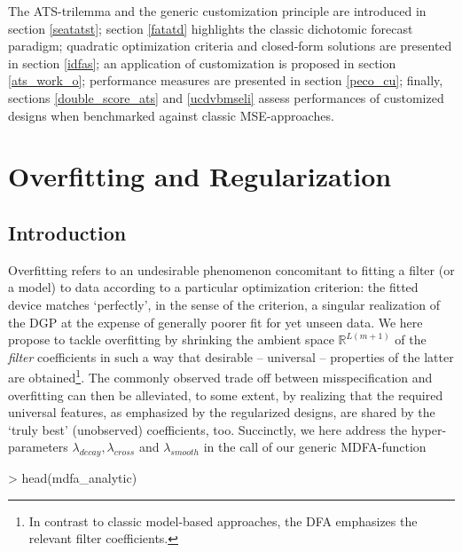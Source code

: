 \documentclass[a4paper]{book}
\begin{document}
The ATS-trilemma and the generic customization principle are introduced
 in section \ref{seatatst}; section \ref{fatatd} highlights the classic
 dichotomic forecast paradigm; quadratic optimization criteria and 
closed-form solutions are presented in section \ref{idfas}; an application
 of customization is proposed in section \ref{ats_work_o}; performance
 measures are presented in section \ref{peco_cu}; finally,
 sections \ref{double_score_ats} and \ref{ucdvbmseli} assess 
performances of customized designs when benchmarked against classic
 MSE-approaches. 










\chapter{Overfitting and Regularization}\label{reg_sec}

\section{Introduction}


Overfitting refers to an undesirable phenomenon concomitant to fitting a filter (or a model) to data according to a particular optimization criterion: the fitted device matches `perfectly', in the sense of the criterion, a singular realization of the DGP at the expense of generally poorer fit for yet unseen data. We here propose to tackle overfitting by shrinking the ambient space $\mathbb{R}^{L(m+1)}$ of the \emph{filter} coefficients in such a way that desirable -- universal -- properties of the latter are obtained\footnote{In contrast to classic model-based approaches, the DFA  emphasizes the relevant filter coefficients.}. The commonly observed trade off between misspecification and overfitting can then be alleviated,  to some extent, by realizing that the required universal features, as emphasized by the regularized designs, are shared by the `truly best' (unobserved) coefficients, too. Succinctly,  we here address the hyper-parameters $\lambda_{decay},\lambda_{cross}$ and $\lambda_{smooth}$ in the call of our generic MDFA-function
\begin{Schunk}
\begin{Sinput}
> head(mdfa_analytic)
\end{Sinput}
\begin{Soutput}
1 function (L, lambda, weight_func, Lag, Gamma, eta, cutoff, i1,             
2     i2, weight_constraint, lambda_cross, lambda_decay, lambda_smooth,      
3     lin_eta, shift_constraint, grand_mean, b0_H0, c_eta, weight_structure, 
4     white_noise, synchronicity, lag_mat, troikaner)                        
5 {                                                                          
6     lambda <- abs(lambda)                                                  
\end{Soutput}
\end{Schunk}
\end{document}
